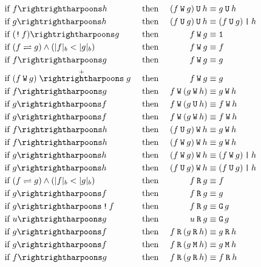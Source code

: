 \documentclass[a4paper,twoside,10pt,DIV=12]{scrreprt}
\DeclareMathOperator{\G}{\texttt{G}}
\newcommand{\U}{\mathbin{\texttt{U}}}
\newcommand{\R}{\mathbin{\texttt{R}}}
\newcommand{\M}{\mathbin{\texttt{M}}}
\newcommand{\W}{\mathbin{\texttt{W}}}
\DeclareMathOperator{\NOT}{\texttt{!}}
\newcommand{\OR}{\mathbin{\texttt{|}}}
\newcommand{\0}{\texttt{0}}
\newcommand{\1}{\texttt{1}}
\def\simp{\rightrightharpoons}
\def\Simp{\stackrel{+}{\simp}}
\begin{document}
\begin{alignat*}{3}
\text{if~} & f\simp h        && \text{~then~} & (f\W g) \U h        & \equiv g \U h          \\
\text{if~} & g\simp h        && \text{~then~} & (f\U g) \U h        & \equiv (f \U g) \OR h  \\
\text{if~} & (\NOT f)\simp g && \text{~then~} & f\W g               & \equiv \1              \\
\text{if~} & \flessg         && \text{~then~} & f\W g               & \equiv f               \\
\text{if~} & f\simp g        && \text{~then~} & f\W g               & \equiv g               \\
\text{if~} & (f\W g)\Simp g  && \text{~then~} & f\W g               & \equiv g               \\
\text{if~} & f\simp g        && \text{~then~} & f\W (g \W h)        & \equiv g \W h          \\
\text{if~} & g\simp f        && \text{~then~} & f\W (g \U h)        & \equiv f \W h          \\
\text{if~} & g\simp f        && \text{~then~} & f\W (g \W h)        & \equiv f \W h          \\
\text{if~} & f\simp h        && \text{~then~} & (f\U g) \W h        & \equiv g \W h          \\
\text{if~} & f\simp h        && \text{~then~} & (f\W g) \W h        & \equiv g \W h          \\
\text{if~} & g\simp h        && \text{~then~} & (f\W g) \W h        & \equiv (f \W g) \OR h  \\
\text{if~} & g\simp h        && \text{~then~} & (f\U g) \W h        & \equiv (f \U g) \OR h  \\
\text{if~} & \flessg         && \text{~then~} & f\R g               & \equiv f               \\
\text{if~} & g\simp f        && \text{~then~} & f\R g               & \equiv g               \\
\text{if~} & g\simp \NOT f   && \text{~then~} & f\R g               & \equiv \G g            \\
\text{if~} & u\simp g        && \text{~then~} & u\R g               & \equiv \G g            \\
\text{if~} & g\simp f        && \text{~then~} & f\R (g \R h)        & \equiv g \R h          \\
\text{if~} & g\simp f        && \text{~then~} & f\R (g \M h)        & \equiv g \M h          \\
\text{if~} & f\simp g        && \text{~then~} & f\R (g \R h)        & \equiv f \R h          \\

\end{alignat*}
\end{document}
